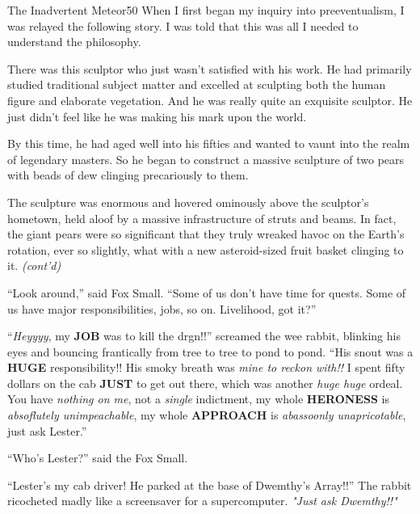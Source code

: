 \documentclass[10pt,twoside]{report}
\begin{document}
	\begin{sidebar}{The Inadvertent Meteor}{50}
		When I first began my inquiry into preeventualism, I was relayed the following story. I was told that this was all I needed to understand the philosophy.\vspace{6pt}
		
		There was this sculptor who just wasn't satisfied with his work. He had primarily studied traditional subject matter and excelled at sculpting both the human figure and elaborate vegetation. And he was really quite an exquisite sculptor. He just didn't feel like he was making his mark upon the world.\vspace{6pt}
		
		By this time, he had aged well into his fifties and wanted to vaunt into the realm of legendary masters. So he began to construct a massive sculpture of two pears with beads of dew clinging precariously to them.\vspace{6pt}
		
		The sculpture was enormous and hovered ominously above the sculptor's hometown, held aloof by a massive infrastructure of struts and beams. In fact, the giant pears were so significant that they truly wreaked havoc on the Earth's rotation, ever so slightly, what with a new asteroid-sized fruit basket clinging to it. \textit{(cont'd)}
	\end{sidebar}

``Look around,'' said Fox Small.  ``Some of us don't have time for
        quests.  Some of us have major responsibilities, jobs, so on.
        Livelihood, got it?''

``{\em Heyyyy}, my {\bf JOB} was to kill the drgn!!'' screamed the wee
        rabbit, blinking his eyes and bouncing frantically from tree
        to tree to pond to pond.  ``His snout was a {\bf HUGE}
        responsibility!!  His smoky breath was {\em mine to reckon
          with!!} I spent fifty dollars on the cab {\bf JUST} to get
        out there, which was another {\em huge huge} ordeal.  You have
        {\em nothing on me}, not a {\em single} indictment, my whole
        {\bf HERONESS} is {\em absoflutely unimpeachable}, my whole
        {\bf APPROACH} is {\em abassoonly unapricotable}, just ask
        Lester.''

``Who's Lester?'' said the Fox Small.

``Lester's my cab driver!  He parked at the base of Dwemthy's
        Array!!''  The rabbit ricocheted madly like a screensaver for
        a supercomputer.  {\em "Just ask Dwemthy!!"}
\end{document}
